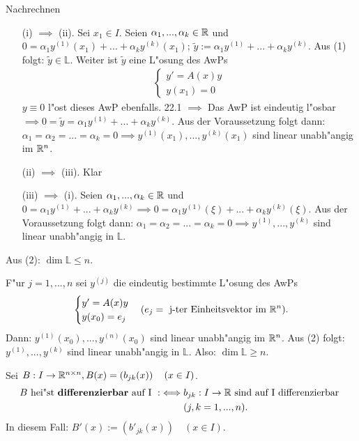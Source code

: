 \documentclass[a4paper,twoside,DIV15,BCOR12mm,chapterprefix=true,headings=twolinechapter]{scrbook}
\begin{document}
\begin{beweise}
\item Nachrechnen

\item \begin{enumerate}
  \item[(i)] $\implies$ (ii). Sei $x_1 \in I$. Seien $\alpha_1, ...,  
\alpha_k \in \mathbb{R}$ und $0 = \alpha_1 y^{(1)}(x_1) + ... + \alpha_k y^ 
{(k)}(x_1)$; $\tilde y := \alpha_1 y^{(1)} + ... + \alpha_k y^{(k)}$.  
Aus (1) folgt: $\tilde y \in \mathbb{L}$. Weiter ist $\tilde y$ eine  
L"osung des AwPs
\begin{align*} \begin{cases}
y' = A(x) y\\
y(x_1) = 0
\end{cases} \end{align*}
$y \equiv 0$ l"ost dieses AwP ebenfalls. 22.1 $\implies$ Das AwP ist  
eindeutig l"osbar $\implies 0 = \tilde y = \alpha_1 y^{(1)} + ... +  
\alpha_k y^{(k)}$. Aus der Voraussetzung folgt dann: $\alpha_1 =  
\alpha_2 = ... = \alpha_k = 0 \implies y^{(1)}(x_1), ..., y^{(k)} 
(x_1)$ sind linear unabh"angig im $\mathbb{R}^n$.
  \item[(ii)] $\implies$ (iii). Klar \checkmark
  \item[(iii)] $\implies$ (i). Seien $\alpha_1, ..., \alpha_k \in \mathbb{R}$  
und $0 = \alpha_1 y^{(1)} + ... + \alpha_k y^{(k)} \implies 0 =  
\alpha_1 y^{(1)}(\xi ) + ... + \alpha_k y^{(k)}(\xi )$. Aus der  
Voraussetzung folgt dann: $\alpha_1 = \alpha_2 = ... = \alpha_k = 0  
\implies y^{(1)}, ..., y^{(k)}$ sind linear unabh"angig in $\mathbb{L}$. 
\end{enumerate}

\item Aus (2): $\dim \mathbb{L} \le n$.

F"ur $j = 1,..., n$ sei $y^{(j)}$ die eindeutig bestimmte L"osung des  
AwPs
\begin{align*}
\begin{cases}
y' = A(x) y\\
y(x_0) = e_j
\end{cases}
(e_j = \text{ j-ter Einheitsvektor im }\mathbb{R}^n).
\end{align*}
Dann: $y^{(1)}(x_0), ..., y^{(n)}(x_0)$ sind linear unabh"angig im $ 
\mathbb{R}^n$. Aus (2) folgt: $y^{(1)}, ..., y^{(k)}$ sind linear unabh"angig  
in $\mathbb{L}$. Also: $\dim \mathbb{L} \ge n$.
\end{beweise}

\begin{definition}
Sei $B : I \to \mathbb{R}^{n \times n}, B(x) = \left( b_{jk}(x) \right)  
\quad (x \in I)$. 
\begin{align*}
B \text{ hei"st \textbf{differenzierbar} auf I } :\iff &b_{jk} : I \to \mathbb{R} \text{ sind auf I differenzierbar }\\ 
&(j,k = 1, ..., n).
\end{align*}
In diesem Fall: $B'(x) := (b'_{jk}(x)) \quad (x\in I)$.
\end{definition}
\end{document}
